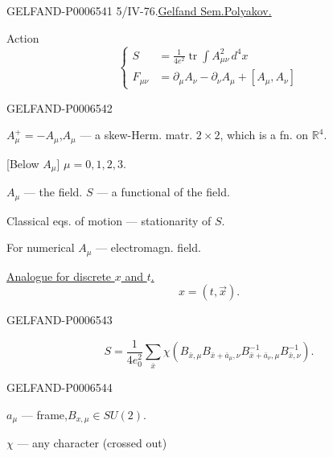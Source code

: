 \begin{GelfandAdjacentEvidence}{GELFAND-P000654}{1}
5/IV-76.\quad \underline{Gelfand Sem.}\quad \underline{Polyakov.}

Action
\[
\left\{\begin{aligned}
S&=\frac1{4e^2}\operatorname{tr}\int A_{\mu\nu}^{2}\,d^4x\\
F_{\mu\nu}&=\partial_\mu A_\nu-\partial_\nu A_\mu+[A_\mu,A_\nu]
\end{aligned}\right.
\]
\end{GelfandAdjacentEvidence}
\begin{GelfandAdjacentEvidence}{GELFAND-P000654}{2}

\(A_\mu^+=-A_\mu\),\quad \(A_\mu\) --- a skew-Herm. matr. \(2\times2\),
which is a fn. on \(\mathbb R^4\).

[Below \(A_\mu\)] \(\mu=0,1,2,3\).

\(A_\mu\) --- the field. \(S\) --- a functional of the field.

Classical eqs. of motion --- stationarity of \(S\).

For numerical \(A_\mu\) --- electromagn. field.

\underline{Analogue for discrete \(x\) and \(t\).}
\[
x=(t,\vec{x}).
\]
\end{GelfandAdjacentEvidence}
\begin{GelfandAdjacentEvidence}{GELFAND-P000654}{3}

\[
S=\frac{1}{4e_0^2}\sum_{\bar x}\chi\left(
B_{\bar x,\mu} B_{\bar x+\bar a_\mu,\nu}
B^{-1}_{\bar x+\bar a_\nu,\mu} B^{-1}_{\bar x,\nu}
\right).
\]
\end{GelfandAdjacentEvidence}
\begin{GelfandAdjacentEvidence}{GELFAND-P000654}{4}

\(a_\mu\) --- frame,\qquad \(B_{x,\mu}\in SU(2)\).

\(\chi\) --- any character (crossed out)
\end{GelfandAdjacentEvidence}

